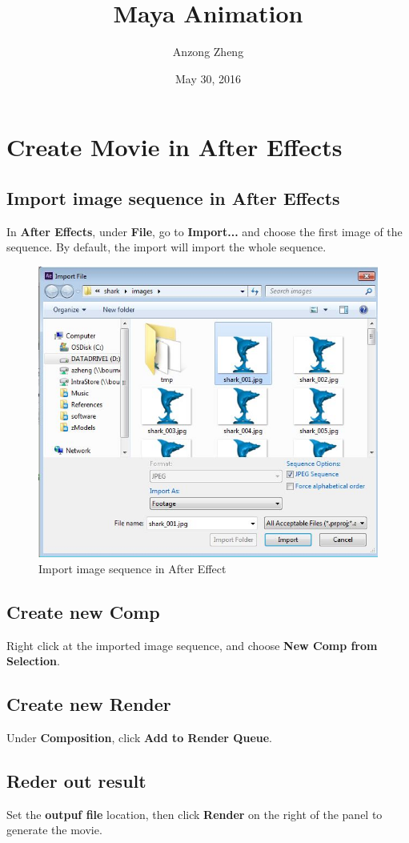 \documentclass[10pt,a4paper]{article}
\begin{document}
\author{Anzong Zheng}
\title{Maya Animation}
\date{May 30, 2016}
\maketitle

\tableofcontents

\newpage

\section{Create Movie in After Effects}
\subsection{Import image sequence in After Effects}
In \textbf{After Effects}, under \textbf{File}, go to \textbf{Import...} and choose the first image of the sequence. By default, the import will import the whole sequence.

\begin{figure}[h]
\centering
\includegraphics[scale=0.3]{importImageSeq_inAE}
\caption{Import image sequence in After Effect}
\label{fig:importImageSeq_inAE}
\end{figure}

\subsection{Create new Comp}
Right click at the imported image sequence, and choose \textbf{New Comp from Selection}.

\subsection{Create new Render}
Under \textbf{Composition}, click \textbf{Add to Render Queue}.

\subsection{Reder out result}
Set the \textbf{outpuf file} location, then click \textbf{Render} on the right of the panel to generate the movie.
\end{document}
